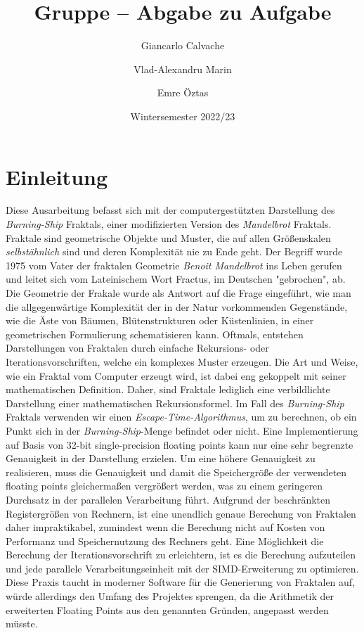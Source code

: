 \documentclass[course=erap]{aspdoc}
\author{Giancarlo Calvache \and Vlad-Alexandru Marin \and Emre Öztas}
\date{Wintersemester 2022/23} %
\title{Gruppe \theGroup{} -- Abgabe zu Aufgabe \theNumber}
\begin{document}
\maketitle

\section{Einleitung}

Diese Ausarbeitung befasst sich mit der computergestützten Darstellung des \emph{Burning-Ship} Fraktals, einer modifizierten Version des \emph{Mandelbrot} Fraktals.
Fraktale\cite{FractalGeometry} sind geometrische Objekte und Muster, die auf allen Größenskalen \emph{selbstähnlich} sind und deren Komplexität nie zu Ende geht. Der Begriff wurde 1975 vom Vater der fraktalen Geometrie \emph{Benoit Mandelbrot} ins Leben gerufen und leitet sich vom Lateinischem Wort Fractus, im Deutschen "gebrochen", ab. Die Geometrie der Frakale wurde als Antwort auf die Frage eingeführt, wie man die allgegenwärtige Komplexität der in der Natur vorkommenden Gegenstände, wie die Äste von Bäumen, Blütenstrukturen oder Küstenlinien, in einer geometrischen Formulierung schematisieren kann.
\newline
Oftmals, entstehen Darstellungen von Fraktalen durch einfache Rekursions- oder Iterationsvorschriften, welche ein komplexes Muster erzeugen. Die Art und Weise, wie ein Fraktal vom Computer erzeugt wird, ist dabei eng gekoppelt mit seiner mathematischen Definition. Daher, sind Fraktale lediglich eine verbildlichte Darstellung einer mathematischen Rekursionsformel. Im Fall des \emph{Burning-Ship} Fraktals verwenden wir einen \emph{Escape-Time-Algorithmus}, um zu berechnen, ob ein Punkt sich in der \emph{Burning-Ship}-Menge befindet oder nicht.
\newline
 Eine Implementierung auf Basis von 32-bit single-precision floating points kann nur eine sehr begrenzte Genauigkeit in der Darstellung erzielen. Um eine höhere Genauigkeit zu realisieren, muss die Genauigkeit und damit die Speichergröße der verwendeten floating points gleichermaßen vergrößert werden, was zu einem geringeren Durchsatz in der parallelen Verarbeitung führt.
Aufgrund der beschränkten Registergrößen von Rechnern, ist eine unendlich genaue Berechung von Fraktalen daher impraktikabel, zumindest wenn die Berechung nicht auf Kosten von Performanz und Speichernutzung des Rechners geht. Eine Möglichkeit die Berechung der Iterationsvorschrift zu erleichtern, ist es die Berechung aufzuteilen und jede parallele Verarbeitungseinheit mit der SIMD-Erweiterung zu optimieren. Diese Praxis taucht in moderner Software für die Generierung von Fraktalen auf, würde allerdings den Umfang des Projektes sprengen, da die Arithmetik der erweiterten Floating Points aus den genannten Gründen, angepasst werden müsste.
\end{document}
